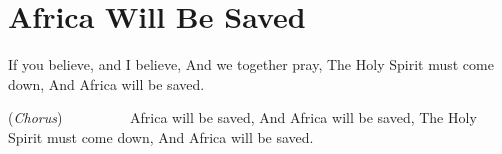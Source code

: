 \starttocol
\chapter{Africa Will Be Saved}
\nexttocol
\hfill{\it }
\stoptocol
\starttocol
\startlines
I{\sc f} you believe, and I believe,
And we together pray,
The Holy Spirit must come down,
And Africa will be saved.

\hfill({\it Chorus})~~~~~~~~~
Africa will be saved,
And Africa will be saved,
The Holy Spirit must come down,
And Africa will be saved.
\stoplines
\nexttocol

\stoptocol
